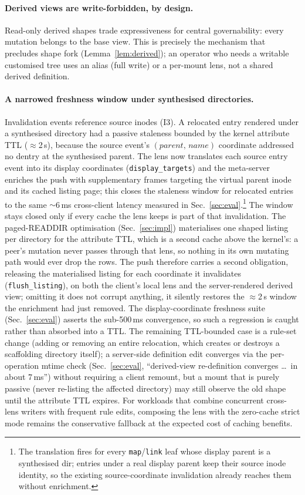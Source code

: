 \documentclass[numberedsection,acmtos]{acmart}
\begin{document}
\paragraph{Derived views are write-forbidden, by design.}
Read-only derived shapes trade expressiveness for central governability: every
mutation belongs to the base view. This is precisely the mechanism that precludes
shape fork (Lemma~\ref{lem:derived}); an operator who
needs a writable customised tree uses an alias (full write) or a per-mount lens,
not a shared derived definition.

\paragraph{A narrowed freshness window under synthesised directories.}
Invalidation events reference source inodes (I3). A relocated entry rendered
under a synthesised directory had a passive staleness bounded
by the kernel attribute TTL ($\approx$2\,s), because the source event's
$(\mathit{parent},\,\mathit{name})$ coordinate addressed no dentry at the
synthesised parent. The lens now translates each source entry event into its
display coordinates (\texttt{display\_targets}) and the meta-server enriches
the push with supplementary frames targeting the virtual parent inode and its
cached listing page; this closes the staleness window for relocated entries to
the same $\sim$6\,ms cross-client latency measured in
Sec.~\ref{sec:eval}.\footnote{The translation fires for every \texttt{map}/\texttt{link}
leaf whose display parent is a synthesised dir; entries under a real display
parent keep their source inode identity, so the existing source-coordinate
invalidation already reaches them without enrichment.}
The window stays closed only if every cache the lens keeps is part of that
invalidation. The paged-READDIR optimisation (Sec.~\ref{sec:impl}) materialises
one shaped listing per directory for the attribute TTL, which is a second cache
above the kernel's: a peer's mutation never passes through that lens, so nothing
in its own mutating path would ever drop the rows. The push therefore carries a
second obligation, releasing the materialised listing for each coordinate it
invalidates (\texttt{flush\_listing}), on both the client's local lens and the
server-rendered derived view; omitting it does not corrupt anything, it silently
restores the $\approx$2\,s window the enrichment had just removed. The
display-coordinate freshness suite (Sec.~\ref{sec:eval}) asserts the sub-500\,ms
convergence, so such a regression is caught rather than absorbed into a TTL.
The remaining TTL-bounded case is a rule-set change (adding or removing
an entire relocation, which creates or destroys a scaffolding directory
itself); a server-side definition edit converges via the per-operation mtime
check (Sec.~\ref{sec:eval}, ``derived-view re-definition converges \dots\ in
about 7\,ms'') without requiring a client remount, but a mount that is purely
passive (never re-listing the affected directory) may still observe the old
shape until the attribute TTL expires. For workloads that combine concurrent
cross-lens writers with frequent rule edits, composing
the lens with the zero-cache strict mode remains the conservative fallback
at the expected cost of caching benefits.
\end{document}
